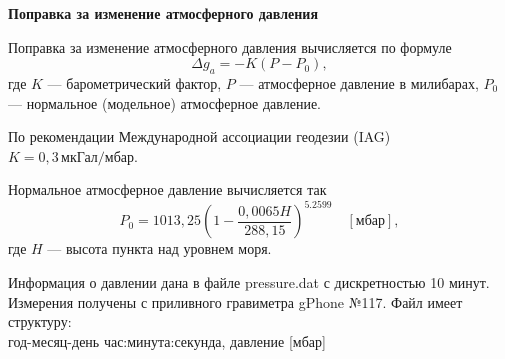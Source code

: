 \documentclass[11pt, a4paper,addpoints]{exam}
\theoremstyle{remark}
\begin{document}
\begin{flushleft}
    \textbf{Поправка за изменение атмосферного давления} 
\end{flushleft}

Поправка за изменение атмосферного давления вычисляется по формуле
\begin{equation*}
    \Delta g_a = - K \left( P - P_0 \right),
\end{equation*}
где $K$ --- барометрический фактор, $P$ --- атмосферное давление в милибарах, $P_0$ --- нормальное
(модельное) атмосферное давление.

По рекомендации Международной ассоциации геодезии (IAG) $K = 0,3\, \text{мкГал/мбар}$.

Нормальное атмосферное давление вычисляется так
\begin{equation*}
    P_0 = 1013,25 \left( 1 - \dfrac{0,0065 H}{288,15} \right)^{5.2599}\quad[\text{мбар}],
\end{equation*}
где $H$ --- высота пункта над уровнем моря.

Информация о давлении дана в файле \textrm{pressure.dat} с дискретностью 10 минут. Измерения
получены с приливного гравиметра gPhone №117. Файл имеет структуру:\\
год-месяц-день час:минута:секунда, давление [мбар]\\

\end{document}
